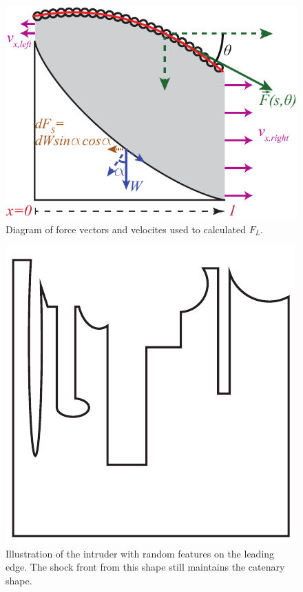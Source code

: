 \begin{figure}
	\includegraphics[width=\textwidth]{Figures/chapter3sup/diagramSupplement}
	\caption{Diagram of force vectors and velocites used to calculated $F_{L}$.}
	\label{diagram}
\end{figure}

\begin{figure}
	\includegraphics[width=\textwidth]{Figures/chapter3sup/randomShape}
	\caption{Illustration of the intruder with random features on the leading edge. The shock front from this shape still maintains the catenary shape.}
	\label{randomShape}
\end{figure}

